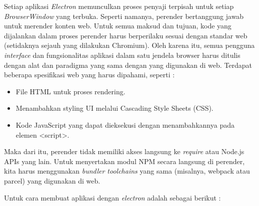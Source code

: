Setiap aplikasi \textit{Electron} memunculkan proses penyaji terpisah untuk setiap \textit{BrowserWindow} yang terbuka. Seperti namanya, perender bertanggung jawab untuk merender konten web. Untuk semua maksud dan tujuan, kode yang dijalankan dalam proses perender harus berperilaku sesuai dengan standar web (setidaknya sejauh yang dilakukan Chromium). Oleh karena itu, semua pengguna \textit{interface} dan fungsionalitas aplikasi dalam satu jendela browser harus ditulis dengan alat dan paradigma yang sama dengan yang digunakan di web. Terdapat beberapa spesifikasi web yang harus dipahami, seperti :

\begin{itemize}
    \item File HTML untuk proses rendering.
    \item Menambahkan styling UI melalui Cascading Style Sheets (CSS).
    \item Kode JavaScript yang dapat dieksekusi dengan menambahkannya pada elemen <script>.
\end{itemize}

Maka dari itu, perender tidak memiliki akses langsung ke \textit{require} atau Node.js APIs yang lain. Untuk menyertakan modul NPM secara langsung di perender, kita harus menggunakan \textit{bundler toolchains} yang sama (misalnya, webpack atau parcel) yang digunakan di web.

Untuk cara membuat aplikasi dengan \textit{electron} adalah sebagai berikut :

